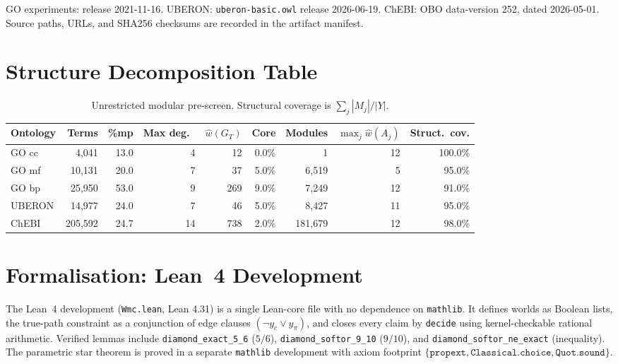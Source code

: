 \documentclass[12pt]{article}
\begin{document}
GO experiments: release 2021-11-16.
UBERON: \texttt{uberon-basic.owl} release 2026-06-19.
ChEBI: OBO data-version 252, dated 2026-05-01.
Source paths, URLs, and SHA256 checksums are recorded in the artifact
manifest.

\section{Structure Decomposition Table}
\label{app:structure}

\begin{table}[t]
\centering
\small
\begin{tabular}{lrrrrrrrr}
\toprule
Ontology & Terms & \%mp & Max deg.\ & $\widehat{w}(G_T)$
& Core & Modules & $\max_j\widehat{w}(A_j)$ & Struct.\ cov. \\
\midrule
GO cc  & 4,041   & 13.0 & 4  & 12  & 0.0\% & 1       & 12 & 100.0\% \\
GO mf  & 10,131  & 20.0 & 7  & 37  & 5.0\% & 6,519   & 5  & 95.0\%  \\
GO bp  & 25,950  & 53.0 & 9  & 269 & 9.0\% & 7,249   & 12 & 91.0\%  \\
UBERON & 14,977  & 24.0 & 7  & 46  & 5.0\% & 8,427   & 11 & 95.0\%  \\
ChEBI  & 205,592 & 24.7 & 14 & 738 & 2.0\% & 181,679 & 12 & 98.0\%  \\
\bottomrule
\end{tabular}
\caption{Unrestricted modular pre-screen. Structural coverage is
$\sum_j|M_j|/|Y|$.}
\label{tab:structure}
\end{table}

\section{Formalisation: Lean~4 Development}
\label{app:lean}

The Lean~4 development (\texttt{Wmc.lean}, Lean 4.31) is a
single Lean-core file with no dependence on \texttt{mathlib}. It
defines worlds as Boolean lists, the true-path constraint as a
conjunction of edge clauses $(\neg y_c\vee y_\pi)$, and closes every
claim by \texttt{decide} using kernel-checkable rational arithmetic.
Verified lemmas include \texttt{diamond\_exact\_5\_6} ($5/6$),
\texttt{diamond\_softor\_9\_10} ($9/10$), and
\texttt{diamond\_softor\_ne\_exact} (inequality). The parametric star
theorem is proved in a separate \texttt{mathlib} development with
axiom footprint $\{\texttt{propext},\texttt{Classical.choice},
\texttt{Quot.sound}\}$.
\end{document}
